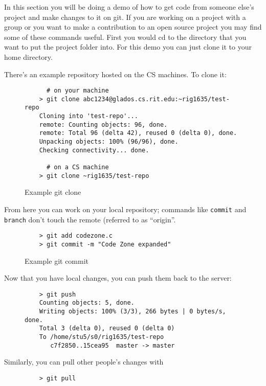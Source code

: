 \documentclass[11pt]{report}
\begin{document}
In this section you will be doing a demo of how to get code from
someone else's project and make changes to it on git. If you are
working on a project with a group or you want to make a contribution
to an open source project you may find some of these commands useful.
First you would cd to the directory that you want to put the project
folder into.  For this demo you can just clone it to your home
directory.

There's an example repository hosted on the CS machines. To clone it:

\begin{figure}[H]
  \caption{Example git clone}
  \begin{lstlisting}
      # on your machine
    > git clone abc1234@glados.cs.rit.edu:~rig1635/test-repo
    Cloning into 'test-repo'...
    remote: Counting objects: 96, done.
    remote: Total 96 (delta 42), reused 0 (delta 0), done.
    Unpacking objects: 100% (96/96), done.
    Checking connectivity... done.

      # on a CS machine
    > git clone ~rig1635/test-repo
  \end{lstlisting}
\end{figure}

From here you can work on your local repository; commands like
\texttt{commit} and \texttt{branch} don't touch the remote (referred
to as ``origin''.

\begin{figure}[H]
  \caption{Example git commit}
  \begin{lstlisting}
    > git add codezone.c
    > git commit -m "Code Zone expanded"
  \end{lstlisting}
\end{figure}

Now that you have local changes, you can push them back to the server:

\begin{figure}[H]
  \begin{lstlisting}
    > git push
    Counting objects: 5, done.
    Writing objects: 100% (3/3), 266 bytes | 0 bytes/s, done.
    Total 3 (delta 0), reused 0 (delta 0)
    To /home/stu5/s0/rig1635/test-repo
       c7f2850..15cea95  master -> master
  \end{lstlisting}
\end{figure}

Similarly, you can pull other people's changes with

\begin{figure}[H]
  \begin{lstlisting}
    > git pull
  \end{lstlisting}
\end{figure}
\end{document}
